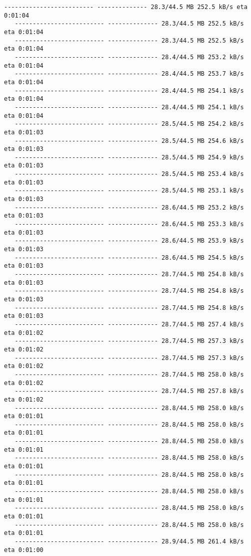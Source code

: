 \documentclass[11pt]{article}
\begin{document}
\begin{Verbatim}[commandchars=\\\{\}]
   ------------------------- -------------- 28.3/44.5 MB 252.5 kB/s eta 0:01:04
   ------------------------- -------------- 28.3/44.5 MB 252.5 kB/s eta 0:01:04
   ------------------------- -------------- 28.3/44.5 MB 252.5 kB/s eta 0:01:04
   ------------------------- -------------- 28.4/44.5 MB 253.2 kB/s eta 0:01:04
   ------------------------- -------------- 28.4/44.5 MB 253.7 kB/s eta 0:01:04
   ------------------------- -------------- 28.4/44.5 MB 254.1 kB/s eta 0:01:04
   ------------------------- -------------- 28.4/44.5 MB 254.1 kB/s eta 0:01:04
   ------------------------- -------------- 28.5/44.5 MB 254.2 kB/s eta 0:01:03
   ------------------------- -------------- 28.5/44.5 MB 254.6 kB/s eta 0:01:03
   ------------------------- -------------- 28.5/44.5 MB 254.9 kB/s eta 0:01:03
   ------------------------- -------------- 28.5/44.5 MB 253.4 kB/s eta 0:01:03
   ------------------------- -------------- 28.5/44.5 MB 253.1 kB/s eta 0:01:03
   ------------------------- -------------- 28.6/44.5 MB 253.2 kB/s eta 0:01:03
   ------------------------- -------------- 28.6/44.5 MB 253.3 kB/s eta 0:01:03
   ------------------------- -------------- 28.6/44.5 MB 253.9 kB/s eta 0:01:03
   ------------------------- -------------- 28.6/44.5 MB 254.5 kB/s eta 0:01:03
   ------------------------- -------------- 28.7/44.5 MB 254.8 kB/s eta 0:01:03
   ------------------------- -------------- 28.7/44.5 MB 254.8 kB/s eta 0:01:03
   ------------------------- -------------- 28.7/44.5 MB 254.8 kB/s eta 0:01:03
   ------------------------- -------------- 28.7/44.5 MB 257.4 kB/s eta 0:01:02
   ------------------------- -------------- 28.7/44.5 MB 257.3 kB/s eta 0:01:02
   ------------------------- -------------- 28.7/44.5 MB 257.3 kB/s eta 0:01:02
   ------------------------- -------------- 28.7/44.5 MB 258.0 kB/s eta 0:01:02
   ------------------------- -------------- 28.7/44.5 MB 257.8 kB/s eta 0:01:02
   ------------------------- -------------- 28.8/44.5 MB 258.0 kB/s eta 0:01:01
   ------------------------- -------------- 28.8/44.5 MB 258.0 kB/s eta 0:01:01
   ------------------------- -------------- 28.8/44.5 MB 258.0 kB/s eta 0:01:01
   ------------------------- -------------- 28.8/44.5 MB 258.0 kB/s eta 0:01:01
   ------------------------- -------------- 28.8/44.5 MB 258.0 kB/s eta 0:01:01
   ------------------------- -------------- 28.8/44.5 MB 258.0 kB/s eta 0:01:01
   ------------------------- -------------- 28.8/44.5 MB 258.0 kB/s eta 0:01:01
   ------------------------- -------------- 28.8/44.5 MB 258.0 kB/s eta 0:01:01
   ------------------------- -------------- 28.9/44.5 MB 261.4 kB/s eta 0:01:00

\end{Verbatim}
\end{document}
